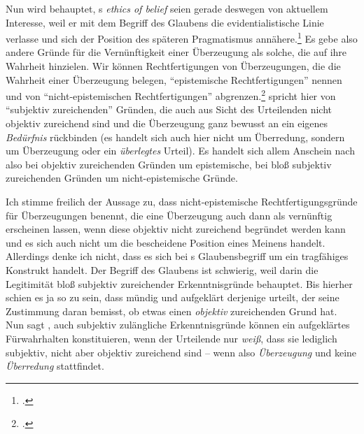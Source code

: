 Nun wird behauptet, s \emph{ethics of belief} seien gerade
deswegen von aktuellem Interesse, weil er mit dem Begriff des Glaubens die
evidentialistische Linie verlasse und sich der Position des späteren
Pragmatismus
annähere.\footnote{\cite[Vgl.][335]{Chignell:BeliefinKant2007}.}
Es gebe also andere Gründe für die Vernünftigkeit einer Überzeugung als solche,
die auf ihre Wahrheit hinzielen. Wir können Rechtfertigungen von
Überzeugungen, die die Wahrheit einer Überzeugung belegen, \enquote{epistemische
Rechtfertigungen} nennen und von \enquote{nicht-epistemischen Rechtfertigungen}
abgrenzen.\footcite[Vgl.][34]{Chignell:KantsConceptsofJustification2007}
 spricht hier von \enquote{subjektiv zureichenden} Gründen,
die auch aus Sicht des Urteilenden nicht objektiv zureichend sind und die
Überzeugung ganz bewusst an ein eigenes \emph{Bedürfnis} rückbinden (es handelt
sich auch hier nicht um Überredung, sondern um Überzeugung oder ein
\emph{überlegtes} Urteil). Es handelt sich allem Anschein nach also bei objektiv
zureichenden Gründen um epistemische, bei bloß subjektiv zureichenden Gründen um
nicht-epistemische Gründe.

Ich stimme freilich der Aussage zu, dass 
nicht-epistemische Rechtfertigungsgründe für Überzeugungen benennt, die eine
Überzeugung auch dann als vernünftig erscheinen lassen, wenn diese objektiv
nicht zureichend begründet werden kann und es sich auch nicht um die bescheidene
Position eines Meinens handelt. Allerdings denke ich nicht, dass es sich bei
s Glaubensbegriff um ein tragfähiges Konstrukt handelt.
Der Begriff des Glaubens ist schwierig, weil 
darin die Legitimität bloß subjektiv zureichender Erkenntnisgründe behauptet.
Bis hierher schien es ja so zu sein, dass mündig und aufgeklärt derjenige
urteilt, der seine Zustimmung daran bemisst, ob etwas einen \emph{objektiv}
zureichenden Grund hat. Nun sagt , auch subjektiv
zulängliche Erkenntnisgründe können ein aufgeklärtes Fürwahrhalten
konstituieren, wenn der Urteilende nur \emph{weiß}, dass sie lediglich
subjektiv, nicht aber objektiv zureichend sind -- wenn also \emph{Überzeugung}
und keine \emph{Überredung} stattfindet.

